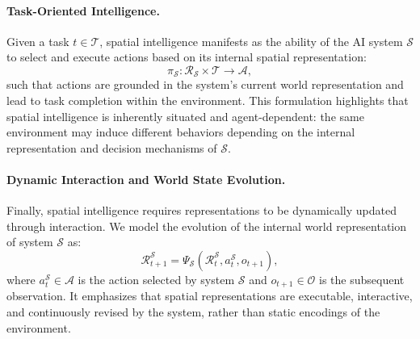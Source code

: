 \paragraph{Task-Oriented Intelligence.}
Given a task $t \in \mathcal{T}$, spatial intelligence manifests as the ability of the AI system $\mathcal{S}$ to select and execute actions based on its internal spatial representation:
\begin{equation}
\pi_{\mathcal{S}} : \mathcal{R}_{\mathcal{S}} \times \mathcal{T} \rightarrow \mathcal{A},
\end{equation}
such that actions are grounded in the system’s current world representation and lead to task completion within the environment.
This formulation highlights that spatial intelligence is inherently situated and agent-dependent: the same environment may induce different behaviors depending on the internal representation and decision mechanisms of $\mathcal{S}$.






\paragraph{Dynamic Interaction and World State Evolution.}
Finally, spatial intelligence requires representations to be dynamically updated through interaction.
We model the evolution of the internal world representation of system $\mathcal{S}$ as:
\begin{equation}
\mathcal{R}^{\mathcal{S}}_{t+1} = \Psi_{\mathcal{S}}(\mathcal{R}^{\mathcal{S}}_t, a^{\mathcal{S}}_t, o_{t+1}),
\end{equation}
where $a^{\mathcal{S}}_t \in \mathcal{A}$ is the action selected by system $\mathcal{S}$ and $o_{t+1} \in \mathcal{O}$ is the subsequent observation.
It emphasizes that spatial representations are executable, interactive, and continuously revised by the system, rather than static encodings of the environment.






